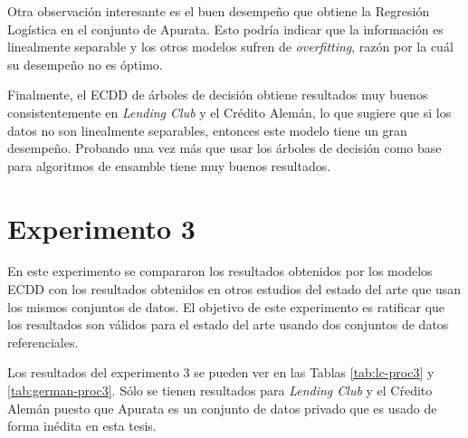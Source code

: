 Otra observación interesante es el buen desempeño que obtiene la Regresión Logística en el conjunto de Apurata. Esto podría indicar que la información es linealmente separable y los otros modelos sufren de \textit{overfitting}, razón por la cuál su desempeño no es óptimo.

Finalmente, el \ac{ECDD} de árboles de decisión obtiene resultados muy buenos consistentemente en \textit{Lending Club} y el Crédito Alemán, lo que sugiere que si los datos no son linealmente separables, entonces este modelo tiene un gran desempeño. Probando una vez más que usar los árboles de decisión como base para algoritmos de ensamble tiene muy buenos resultados.



\section{Experimento 3} %

En este experimento se compararon los resultados obtenidos por los modelos \ac{ECDD} con los resultados obtenidos en otros estudios del estado del arte que usan los mismos conjuntos de datos. El objetivo de este experimento es ratificar que los resultados son válidos para el estado del arte usando dos conjuntos de datos referenciales.

Los resultados del experimento 3 se pueden ver en las Tablas \ref{tab:lc-proc3} y \ref{tab:german-proc3}. Sólo se tienen resultados para \textit{Lending Club} y el Cŕedito Alemán puesto que Apurata es un conjunto de datos privado que es usado de forma inédita en esta tesis.


